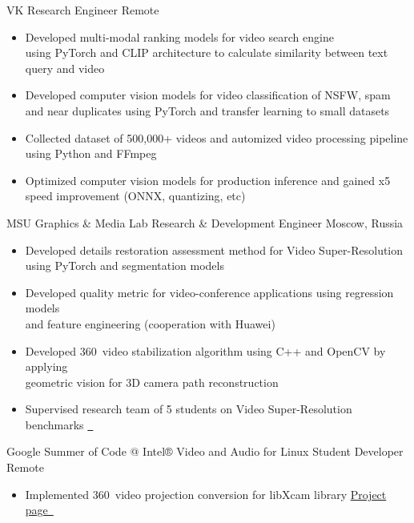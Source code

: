 \documentclass{tccv}
\newcommand{\sphere}{360\textdegree~}
\begin{document}
\begin{eventlist}

     {VK}
     {Research Engineer}
     {Remote}
\begin{itemize}
     \item Developed multi-modal ranking models for video search engine \\ using PyTorch and CLIP architecture to calculate similarity between text query and video
     \item Developed computer vision models for video classification of NSFW, spam \\ and near duplicates using PyTorch and transfer learning to small datasets
     \item Collected dataset of 500,000+ videos and automized video processing pipeline \\ using Python and FFmpeg
     \item Optimized computer vision models for production inference and gained x5 \\ speed improvement (ONNX, quantizing, etc)
\end{itemize}

     {MSU Graphics \& Media Lab}
     {Research \& Development Engineer}
     {Moscow, Russia}
\begin{itemize}
     \item Developed details restoration assessment method for Video Super-Resolution \\ using PyTorch and segmentation models
     \item Developed quality metric for video-conference applications using regression models \\ and feature engineering  (cooperation with Huawei) 
     \item Developed \sphere video stabilization algorithm using C++ and OpenCV by applying \\ geometric vision for 3D camera path reconstruction
     \item Supervised research team of 5 students on Video Super-Resolution benchmarks \href{https://videoprocessing.ai/benchmarks/video-super-resolution.html}{~\faExternalLink*}
\end{itemize}

     {Google Summer of Code @ Intel® Video and Audio for Linux}
     {Student Developer}
     {Remote}
\begin{itemize}
     \item Implemented \sphere video projection conversion for libXcam library\hfill
     \href{https://unishift.github.io/project/2021-08-20-gsoc-libxcam}{Project page~\faExternalLink*}
\end{itemize}


\end{eventlist}
\end{document}
